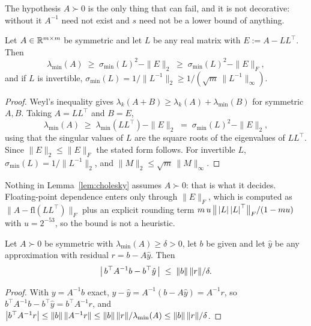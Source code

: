 The hypothesis $A\succ0$ is the only thing that can fail, and it is not decorative:
without it $A^{-1}$ need not exist and $s$ need not be a lower bound of anything.

\begin{lemma}
\label{lem:cholesky}
Let $A\in\mathbb{R}^{m\times m}$ be symmetric and let $L$ be any real matrix with
$E := A-LL^\top$. Then
\[
  \lambda_{\min}(A) \;\ge\; \sigma_{\min}(L)^{2} - \|E\|_2
  \;\ge\; \sigma_{\min}(L)^{2} - \|E\|_F ,
\]
and if $L$ is invertible, $\sigma_{\min}(L)=1/\|L^{-1}\|_2 \ge 1/(\sqrt m\,\|L^{-1}\|_\infty)$.
\end{lemma}
\begin{proof}
Weyl's inequality gives $\lambda_k(A+B)\ge \lambda_k(A)+\lambda_{\min}(B)$ for
symmetric $A,B$. Taking $A=LL^\top$ and $B=E$,
\[
  \lambda_{\min}(A) \;\ge\; \lambda_{\min}(LL^\top) - \|E\|_2
  \;=\; \sigma_{\min}(L)^{2} - \|E\|_2 ,
\]
using that the singular values of $L$ are the square roots of the eigenvalues of
$LL^\top$. Since $\|E\|_2\le\|E\|_F$ the stated form follows. For invertible $L$,
$\sigma_{\min}(L)=1/\|L^{-1}\|_2$, and $\|M\|_2\le\sqrt m\,\|M\|_\infty$.
\end{proof}

Nothing in Lemma~\ref{lem:cholesky} assumes $A\succ0$: that is what it decides.
Floating-point dependence enters only through $\|E\|_F$, which is computed as
$\|A-\mathrm{fl}(LL^\top)\|_F$ plus an explicit rounding term
$m\,u\,\bigl\|\,\left\lvert L\right\rvert\left\lvert L\right\rvert^\top\bigr\|_F/(1-mu)$ with $u=2^{-53}$, so the bound
is not a heuristic.

\begin{lemma}
\label{lem:bracket}
Let $A\succ0$ be symmetric with $\lambda_{\min}(A)\ge\delta>0$, let $b$ be given and
let $\hat y$ be any approximation with residual $r=b-A\hat y$. Then
\[
  \left\lvert \,b^\top A^{-1}b - b^\top\hat y\,\right\rvert \;\le\; \|b\|\,\|r\|/\delta .
\]
\end{lemma}
\begin{proof}
With $y=A^{-1}b$ exact, $y-\hat y=A^{-1}(b-A\hat y)=A^{-1}r$, so
$b^\top A^{-1}b-b^\top\hat y=b^\top A^{-1}r$, and
$\left\lvert b^\top A^{-1}r\right\rvert\le\|b\|\,\|A^{-1}r\|\le\|b\|\,\|r\|/\lambda_{\min}(A)\le
\|b\|\,\|r\|/\delta$.
\end{proof}

